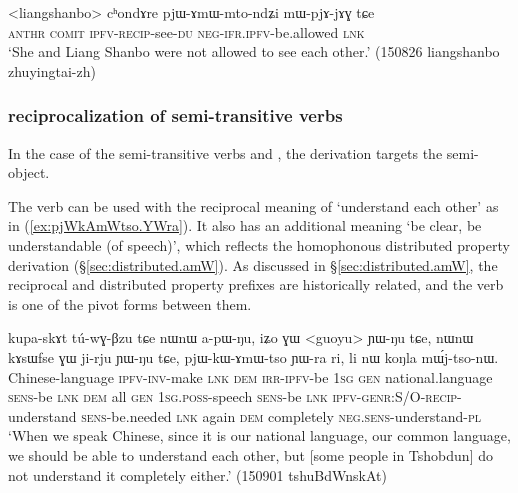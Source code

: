 \begin{exe}
\ex \label{ex:pjAmWmtondZi}
\gll <liangshanbo> cʰondɤre pjɯ-ɤmɯ-mto-ndʑi mɯ-pjɤ-jɤɣ tɕe \\
\textsc{anthr} \textsc{comit} \textsc{ipfv}-\textsc{recip}-see-\textsc{du} \textsc{neg}-\textsc{ifr}.\textsc{ipfv}-be.allowed \textsc{lnk} \\
\glt `She and Liang Shanbo were not allowed to see each other.' (150826 liangshanbo zhuyingtai-zh) 
\end{exe}


\subsubsection{ reciprocalization of semi-transitive verbs}

In the case of the semi-transitive verbs  and , the  derivation targets the semi-object.

The verb  can be used with the reciprocal meaning of `understand each other' as in (\ref{ex:pjWkAmWtso.YWra}). It also has an additional meaning `be clear, be understandable (of speech)', which reflects the homophonous  distributed property derivation (§\ref{sec:distributed.amW}). As discussed in §\ref{sec:distributed.amW}, the reciprocal and distributed property  prefixes are historically related, and the verb  is one of the pivot forms between them.

\begin{exe}
\ex \label{ex:pjWkAmWtso.YWra}
 \gll kupa-skɤt tú-wɣ-βzu tɕe nɯnɯ a-pɯ-ŋu, iʑo ɣɯ <guoyu> ɲɯ-ŋu tɕe, nɯnɯ kɤsɯfse ɣɯ ji-rju ɲɯ-ŋu tɕe, pjɯ-kɯ-ɤmɯ-tso ɲɯ-ra ri, li nɯ koŋla mɯ́j-tso-nɯ. \\
 Chinese-language \textsc{ipfv}-\textsc{inv}-make \textsc{lnk} \textsc{dem} \textsc{irr}-\textsc{ipfv}-be \textsc{1sg} \textsc{gen} national.language \textsc{sens}-be \textsc{lnk} \textsc{dem} all \textsc{gen} \textsc{1sg}.\textsc{poss}-speech \textsc{sens}-be \textsc{lnk} \textsc{ipfv}-\textsc{genr}:S/O-\textsc{recip}-understand \textsc{sens}-be.needed \textsc{lnk} again \textsc{dem} completely \textsc{neg}.\textsc{sens}-understand-\textsc{pl} \\
\glt `When we speak Chinese, since it is our national language, our common language, we should be able to understand each other, but [some people in Tshobdun] do not understand it completely either.' (150901 tshuBdWnskAt)
\end{exe}

